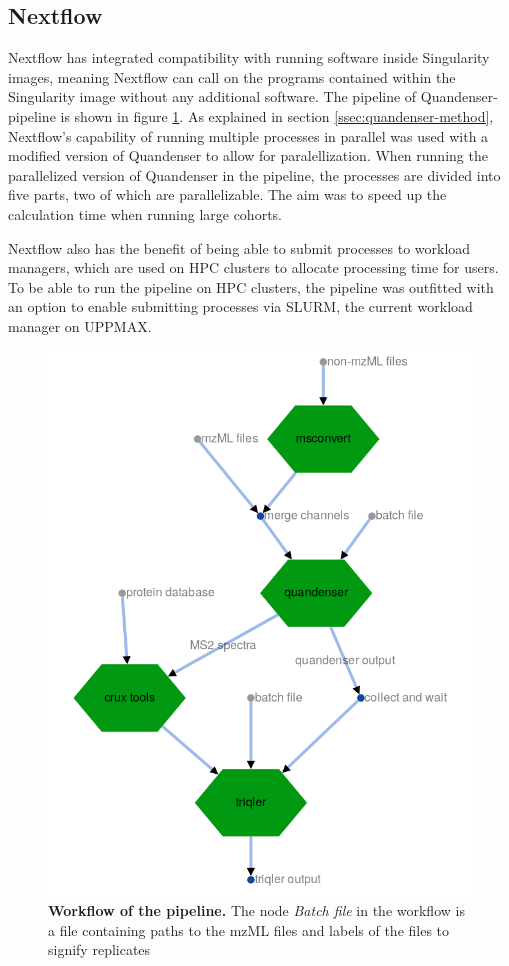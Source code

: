 \subsection{Nextflow}
Nextflow has integrated compatibility with running software inside Singularity images, meaning Nextflow can call on the programs contained within the Singularity image without any additional software. The pipeline of Quandenser-pipeline is shown in figure \ref{fig:workflow}. As explained in section \ref{ssec:quandenser-method}, Nextflow's capability of running multiple processes in parallel was used with a modified version of Quandenser to allow for paralellization. When running the parallelized version of Quandenser in the pipeline, the processes are divided into five parts, two of which are parallelizable. The aim was to speed up the calculation time when running large cohorts.

Nextflow also has the benefit of being able to submit processes to workload managers, which are used on HPC clusters to allocate processing time for users. To be able to run the pipeline on HPC clusters, the pipeline was outfitted with an option to enable submitting processes via SLURM, the current workload manager on UPPMAX.

\begin{figure}[H]
  \begin{center}
  \includegraphics[width=0.5\linewidth]{pictures/workflow.png}
  \caption{\textbf{Workflow of the pipeline.} The node \textit{Batch file} in the workflow is a file containing paths to the mzML files and labels of the files to signify replicates}
  \label{fig:workflow}
  \end{center}
\end{figure}

